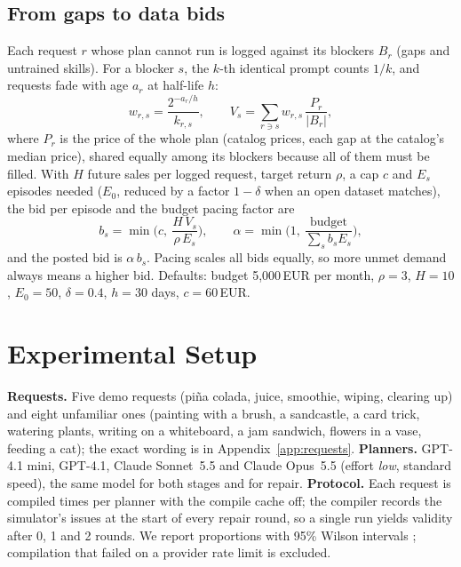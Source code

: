 \documentclass[10pt,twocolumn,letterpaper]{article}
\begin{document}
\subsection{From gaps to data bids}\label{sec:bids}
Each request $r$ whose plan cannot run is logged against its blockers $B_r$
(gaps and untrained skills). For a blocker $s$, the $k$-th identical prompt counts
$1/k$, and requests fade with age $a_r$ at half-life $h$:
\begin{equation}
w_{r,s} = \frac{2^{-a_r/h}}{k_{r,s}}, \qquad
V_s = \sum_{r \ni s} w_{r,s}\,\frac{P_r}{|B_r|},
\end{equation}
where $P_r$ is the price of the whole plan (catalog prices, each gap at the
catalog's median price), shared equally among its blockers because all of them must
be filled. With $H$ future sales per logged request, target return $\rho$, a cap
$c$ and $E_s$ episodes needed ($E_0$, reduced by a factor $1-\delta$ when an open
dataset matches), the bid per episode and the budget pacing factor are
\begin{equation}
b_s = \min\!\Big(c,\ \frac{H\,V_s}{\rho\,E_s}\Big), \qquad
\alpha = \min\!\Big(1,\ \frac{\text{budget}}{\sum_s b_s E_s}\Big),
\end{equation}
and the posted bid is $\alpha\, b_s$. Pacing scales all bids equally, so more unmet
demand always means a higher bid. Defaults: budget 5{,}000\,EUR per month,
$\rho=3$, $H=10$, $E_0=50$, $\delta=0.4$, $h=30$ days, $c=60$\,EUR.

\section{Experimental Setup}\label{sec:exp}
\textbf{Requests.} Five demo requests (pi\~na colada, juice, smoothie, wiping,
clearing up) and eight unfamiliar ones (painting with a brush, a sandcastle, a card
trick, watering plants, writing on a whiteboard, a jam sandwich, flowers in a vase,
feeding a cat); the exact wording is in Appendix~\ref{app:requests}.
\textbf{Planners.} GPT-4.1 mini, GPT-4.1, Claude Sonnet~5.5 and Claude Opus~5.5
(effort \emph{low}, standard speed), the same model for both stages and for repair.
\textbf{Protocol.} Each request is compiled \Runs{} times per planner with the
compile cache off; the compiler records the simulator's issues at the start of
every repair round, so a single run yields validity after 0, 1 and 2 rounds. We
report proportions with 95\% Wilson intervals \cite{wilson1927}; \ApiFailures{}
compilation that failed on a provider rate limit is excluded.
\end{document}
